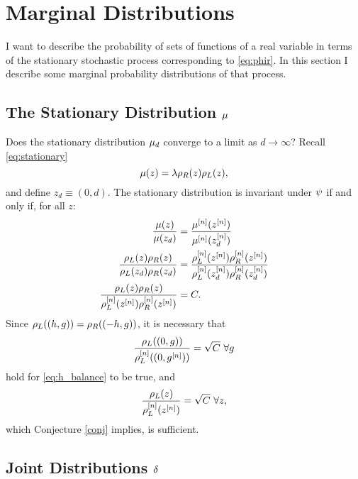 \documentclass[twocolumn]{article}
\begin{document}
\section{Marginal Distributions}
\label{sec:marginal}

I want to describe the probability of sets of functions of a real
variable in terms of the stationary stochastic process corresponding
to \eqref{eq:phir}.  In this section I describe some marginal
probability distributions of that process.

\subsection{The Stationary Distribution $\mu$}
\label{sec:convergence}

Does the stationary distribution $\mu_d$ converge to a limit
as $d \rightarrow \infty$?
Recall \eqref{eq:stationary}
\begin{equation*}
  \mu(z) = \lambda \rho_R(z) \rho_L(z),
\end{equation*}
and define $z_d \equiv (0,d)$.  The stationary distribution is
invariant under $\psi_{}$ if and only if, for all $z$:
\begin{align}
  \frac{\stationary(z)}{\stationary(z_d)} &=
  \frac{\stationary\supn(z\supn)}{\stationary\supn(z\supn_d)} \nonumber\\
%
  \frac{\lefunc(z)\refunc(z)}{\lefunc(z_d)\refunc(z_d)} &=
  \frac{\lefunc\supn(z\supn)\refunc\supn(z\supn)}
       {\lefunc\supn(z_d\supn)\refunc\supn(z_d\supn)}
  \nonumber \\ 
  \label{eq:h_balance}
  \frac{\lefunc(z)\refunc(z)}
       {\lefunc\supn(z\supn)\refunc\supn(z\supn)} &= C.
\end{align}
Since $\rho_L((h,g)) = \rho_R((-h,g))$, it is necessary that
\begin{equation}
  \label{eq:h_zero}
  \frac{\rho_L((0,g))}{\rho_L^{[n]}((0,g^{[n]}))} = \sqrt{C} ~\forall g
\end{equation}
hold for \eqref{eq:h_balance} to be true, and
\begin{equation}
  \label{eq:h_any}
  \frac{\rho_L(z)}{\rho_L^{[n]}(z^{[n]})} = \sqrt{C} ~\forall z,
\end{equation}
which Conjecture \ref{conj} implies, is sufficient.

\subsection{Joint Distributions $\delta_{}$}
\label{sec:convergence_joint}
\end{document}
